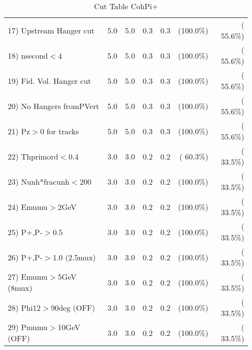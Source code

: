 \begin{table}[h!]
\begin{tabular}{||l||r|r|r|r|r|r||}
 17) Upstream Hanger cut  &          5.0 &          5.0 &          0.3 &          0.3 & (100.0\%) & ( 55.6\%) \\
 18) nsecond$<$4          &          5.0 &          5.0 &          0.3 &          0.3 & (100.0\%) & ( 55.6\%) \\
 19) Fid. Vol. Hanger cut &          5.0 &          5.0 &          0.3 &          0.3 & (100.0\%) & ( 55.6\%) \\
 20) No Hangers fromPVert &          5.0 &          5.0 &          0.3 &          0.3 & (100.0\%) & ( 55.6\%) \\
 21) Pz$>$0 for tracks    &          5.0 &          5.0 &          0.3 &          0.3 & (100.0\%) & ( 55.6\%) \\
 22) Thprimord$<$0.4      &          3.0 &          3.0 &          0.2 &          0.2 & ( 60.3\%) & ( 33.5\%) \\
 23) Nunh*fracunh$<$200   &          3.0 &          3.0 &          0.2 &          0.2 & (100.0\%) & ( 33.5\%) \\
 24) Emumu$>$2GeV         &          3.0 &          3.0 &          0.2 &          0.2 & (100.0\%) & ( 33.5\%) \\
 25) P+,P-$>$0.5          &          3.0 &          3.0 &          0.2 &          0.2 & (100.0\%) & ( 33.5\%) \\
 26) P+,P-$>$1.0 (2.5mux) &          3.0 &          3.0 &          0.2 &          0.2 & (100.0\%) & ( 33.5\%) \\
 27) Emumu$>$5GeV  (8mux) &          3.0 &          3.0 &          0.2 &          0.2 & (100.0\%) & ( 33.5\%) \\
 28) Phi12$>$90deg  (OFF) &          3.0 &          3.0 &          0.2 &          0.2 & (100.0\%) & ( 33.5\%) \\
 29) Pmumu$>$10GeV  (OFF) &          3.0 &          3.0 &          0.2 &          0.2 & (100.0\%) & ( 33.5\%) \\
 \hline
 \hline
 \end{tabular}
 \caption{Cut Table  CohPi+   }
 \label{tab-cutcohjpsi-mumu_nuecc}
 \end{table}
